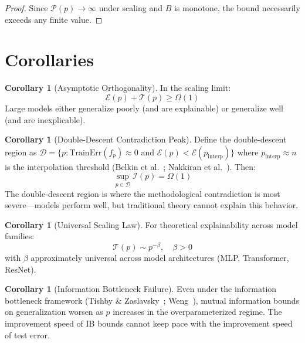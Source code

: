 \documentclass[12pt]{article}
\newcommand{\Pcal}{\mathcal{P}}
\newcommand{\Dcal}{\mathcal{D}}
\theoremstyle{definition}
\newtheorem{corollary}[definition]{Corollary}
\theoremstyle{remark}
\begin{document}
\begin{proof}
Since $\Pcal(p) \to \infty$ under scaling and $B$ is monotone, the bound necessarily exceeds any finite value.
\end{proof}

\section{Corollaries}

\begin{corollary}[Asymptotic Orthogonality]\label{cor:orthogonality}
In the scaling limit:
\begin{equation}
\mathcal{E}(p) + \mathcal{T}(p) \geq \Omega(1)
\end{equation}
Large models either generalize poorly (and are explainable) or generalize well (and are inexplicable).
\end{corollary}

\begin{corollary}[Double-Descent Contradiction Peak]\label{cor:double-descent}
Define the double-descent region as $\Dcal = \{p : \text{TrainErr}(f_p) \approx 0 \text{ and } \mathcal{E}(p) < \mathcal{E}(p_{\text{interp}})\}$ where $p_{\text{interp}} \approx n$ is the interpolation threshold (Belkin et al.~\cite{belkin2019reconciling}; Nakkiran et al.~\cite{nakkiran2020deep}). Then:
\begin{equation}
\sup_{p \in \Dcal} \mathcal{I}(p) = \Omega(1)
\end{equation}
The double-descent region is where the methodological contradiction is most severe---models perform well, but traditional theory cannot explain this behavior.
\end{corollary}

\begin{corollary}[Universal Scaling Law]\label{cor:scaling-law}
For theoretical explainability across model families:
\begin{equation}
\mathcal{T}(p) \sim p^{-\beta}, \quad \beta > 0
\end{equation}
with $\beta$ approximately universal across model architectures (MLP, Transformer, ResNet).
\end{corollary}

\begin{corollary}[Information Bottleneck Failure]\label{cor:ib-failure}
Even under the information bottleneck framework (Tishby \& Zaslavsky~\cite{tishby2015information}; Weng~\cite{weng2020information}), mutual information bounds on generalization worsen as $p$ increases in the overparameterized regime. The improvement speed of IB bounds cannot keep pace with the improvement speed of test error.
\end{corollary}
\end{document}
